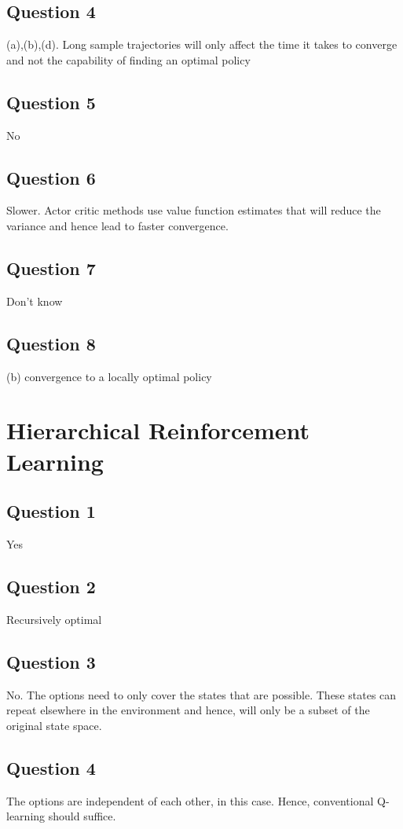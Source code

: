 \documentclass[12pt]{extarticle}
\begin{document}
\subsection{Question 4}
(a),(b),(d). Long sample trajectories will only affect the time it takes to converge and not the capability of finding an optimal policy

\subsection{Question 5}
No

\subsection{Question 6}
Slower. Actor critic methods use value function estimates that will reduce the variance and hence lead to faster convergence.

\subsection{Question 7}
Don't know

\subsection{Question 8}
(b) convergence to a locally optimal policy

\section{Hierarchical Reinforcement Learning}
\subsection{Question 1}
Yes

\subsection{Question 2}
Recursively optimal

\subsection{Question 3}
No. The options need to only cover the states that are possible. These states can repeat elsewhere in the environment and hence, will only be a subset of the original state space.

\subsection{Question 4}
The options are independent of each other, in this case. Hence, conventional Q-learning should suffice.
\end{document}
